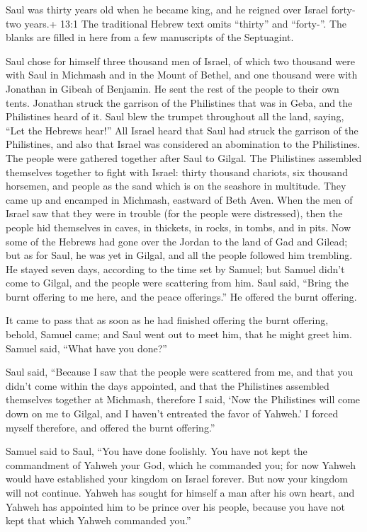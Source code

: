  Saul was thirty years old when he became king, and he
reigned over Israel forty-two years.+ 13:1 The traditional Hebrew text
omits ``thirty'' and ``forty-''. The blanks are filled in here from a
few manuscripts of the Septuagint.

 Saul chose for himself three thousand men of Israel, of
which two thousand were with Saul in Michmash and in the Mount of
Bethel, and one thousand were with Jonathan in Gibeah of Benjamin. He
sent the rest of the people to their own tents.  Jonathan
struck the garrison of the Philistines that was in Geba, and the
Philistines heard of it. Saul blew the trumpet throughout all the land,
saying, ``Let the Hebrews hear!''  All Israel heard that
Saul had struck the garrison of the Philistines, and also that Israel
was considered an abomination to the Philistines. The people were
gathered together after Saul to Gilgal.  The Philistines
assembled themselves together to fight with Israel: thirty thousand
chariots, six thousand horsemen, and people as the sand which is on the
seashore in multitude. They came up and encamped in Michmash, eastward
of Beth Aven.  When the men of Israel saw that they were in
trouble (for the people were distressed), then the people hid themselves
in caves, in thickets, in rocks, in tombs, and in pits.  Now
some of the Hebrews had gone over the Jordan to the land of Gad and
Gilead; but as for Saul, he was yet in Gilgal, and all the people
followed him trembling.  He stayed seven days, according to
the time set by Samuel; but Samuel didn't come to Gilgal, and the people
were scattering from him.  Saul said, ``Bring the burnt
offering to me here, and the peace offerings.'' He offered the burnt
offering.

 It came to pass that as soon as he had finished offering
the burnt offering, behold, Samuel came; and Saul went out to meet him,
that he might greet him.  Samuel said, ``What have you
done?''

Saul said, ``Because I saw that the people were scattered from me, and
that you didn't come within the days appointed, and that the Philistines
assembled themselves together at Michmash,  therefore I
said, `Now the Philistines will come down on me to Gilgal, and I haven't
entreated the favor of Yahweh.' I forced myself therefore, and offered
the burnt offering.''

 Samuel said to Saul, ``You have done foolishly. You have
not kept the commandment of Yahweh your God, which he commanded you; for
now Yahweh would have established your kingdom on Israel forever.
 But now your kingdom will not continue. Yahweh has sought
for himself a man after his own heart, and Yahweh has appointed him to
be prince over his people, because you have not kept that which Yahweh
commanded you.''

